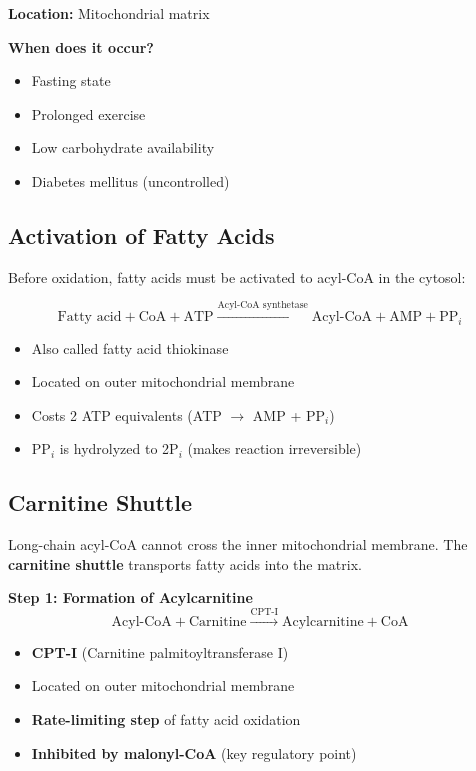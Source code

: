\textbf{Location:} Mitochondrial matrix

\textbf{When does it occur?}
\begin{itemize}
    \item Fasting state
    \item Prolonged exercise
    \item Low carbohydrate availability
    \item Diabetes mellitus (uncontrolled)
\end{itemize}

\subsection{Activation of Fatty Acids}

Before oxidation, fatty acids must be activated to acyl-CoA in the cytosol:

\[
\text{Fatty acid} + \text{CoA} + \text{ATP} \xrightarrow{\text{Acyl-CoA synthetase}} \text{Acyl-CoA} + \text{AMP} + \text{PP}_i
\]

\begin{itemize}
    \item Also called fatty acid thiokinase
    \item Located on outer mitochondrial membrane
    \item Costs 2 ATP equivalents (ATP $\rightarrow$ AMP + PP$_i$)
    \item PP$_i$ is hydrolyzed to 2P$_i$ (makes reaction irreversible)
\end{itemize}

\subsection{Carnitine Shuttle}

Long-chain acyl-CoA cannot cross the inner mitochondrial membrane. The \textbf{carnitine shuttle} transports fatty acids into the matrix.

\textbf{Step 1: Formation of Acylcarnitine}
\[
\text{Acyl-CoA} + \text{Carnitine} \xrightarrow{\text{CPT-I}} \text{Acylcarnitine} + \text{CoA}
\]
\begin{itemize}
    \item \textbf{CPT-I} (Carnitine palmitoyltransferase I)
    \item Located on outer mitochondrial membrane
    \item \textbf{Rate-limiting step} of fatty acid oxidation
    \item \textbf{Inhibited by malonyl-CoA} (key regulatory point)
\end{itemize}

